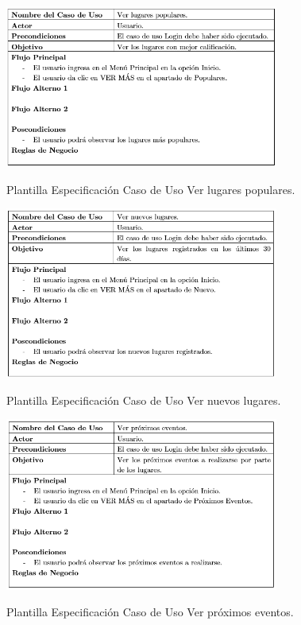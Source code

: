\documentclass[12pt,letterpaper,openany]{book}
\begin{document}
\begin{table}[H]
\centering
\includegraphics[width=9cm]{./imagenes/PCU/ver_lugares_populares}
\caption{Plantilla Especificación Caso de Uso Ver lugares populares.}
\end{table}

\begin{table}[H]
\centering
\includegraphics[width=9cm]{./imagenes/PCU/ver_nuevos_lugares}
\caption{Plantilla Especificación Caso de Uso Ver nuevos lugares.}
\end{table}

\begin{table}[H]
\centering
\includegraphics[width=9cm]{./imagenes/PCU/ver_proximos_eventos}
\caption{Plantilla Especificación Caso de Uso Ver próximos eventos.}
\end{table}
\end{document}
